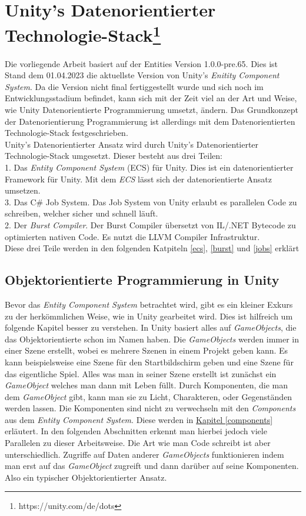 \section{Unity's Datenorientierter Technologie-Stack\footnote{https://unity.com/de/dots}}
Die vorliegende Arbeit basiert auf der Entities Version 1.0.0-pre.65. Dies ist Stand dem 01.04.2023 die aktuellste Version von Unity's \textit{Enitity Component System}. Da die Version nicht final fertiggestellt wurde und sich noch im Entwicklungsstadium befindet, kann sich mit der Zeit viel an der Art und Weise, wie Unity Datenorientierte Programmierung umsetzt, ändern. Das Grundkonzept der Datenorientierung Programmierung ist allerdings mit dem Datenorientierten Technologie-Stack festgeschrieben.\\
Unity's Datenorientierter Ansatz wird durch Unity's Datenorientierter Technologie-Stack umgesetzt. Dieser besteht aus drei Teilen:\\
1. Das \textit{Entity Component System} (ECS) für Unity. Dies ist ein datenorientierter Framework für Unity. Mit dem \textit{ECS} lässt sich der datenorientierte Ansatz umsetzen.\\
3. Das C\# Job System. Das Job System von Unity erlaubt es parallelen Code zu schreiben, welcher sicher und schnell läuft.\\
2. Der \textit{Burst Compiler}. Der Burst Compiler übersetzt von IL/.NET Bytecode zu optimierten nativen Code. Es nutzt die LLVM Compiler Infrastruktur.\\
Diese drei Teile werden in den folgenden Katpiteln \ref{ecs}, \ref{burst} und \ref{jobs} erklärt
\subsection{Objektorientierte Programmierung in Unity}
Bevor das \textit{Entity Component System} betrachtet wird, gibt es ein kleiner Exkurs zu der herkömmlichen Weise, wie in Unity gearbeitet wird. Dies ist hilfreich um folgende Kapitel besser zu verstehen. In Unity basiert alles auf \textit{GameObjects}, die das Objektorientierte schon im Namen haben. Die \textit{GameObjects} werden immer in einer Szene erstellt, wobei es mehrere Szenen in einem Projekt geben kann. Es kann beispielsweise eine Szene für den Startbildschirm geben und eine Szene für das eigentliche Spiel. Alles was man in seiner Szene erstellt ist zunächst ein \textit{GameObject} welches man dann mit Leben füllt. Durch Komponenten, die man dem \textit{GameObject} gibt, kann man sie zu Licht, Charakteren, oder Gegenständen werden lassen. Die Komponenten sind nicht zu verwechseln mit den \textit{Components} aus dem \textit{Entity Component System}. Diese werden in \hyperref[components]{Kapitel \ref{components}} erläutert. In den folgenden Abschnitten erkennt man hierbei jedoch viele Parallelen zu dieser Arbeitsweise. Die Art wie man Code schreibt ist aber unterschiedlich. Zugriffe auf Daten anderer \textit{GameObjects} funktionieren indem man erst auf das \textit{GameObject} zugreift und dann darüber auf seine Komponenten. Also ein typischer Objektorientierter Ansatz.


